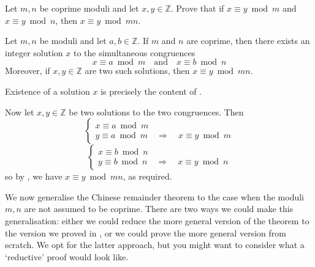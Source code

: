 \begin{exercise}
\label{exCRTUniqueness}
Let $m,n$ be coprime moduli and let $x,y \in \mathbb{Z}$. Prove that if $x \equiv y \bmod m$ and $x \equiv y \bmod n$, then $x \equiv y \bmod{mn}$.
\end{exercise}

\begin{theorem}
\label{thmChineseRemainder}
Let $m,n$ be moduli and let $a,b \in \mathbb{Z}$. If $m$ and $n$ are coprime, then there exists an integer solution $x$ to the simultaneous congruences
\[ x \equiv a \bmod m \quad \text{and} \quad x \equiv b \bmod n \]
Moreover, if $x,y \in \mathbb{Z}$ are two such solutions, then $x \equiv y \bmod{mn}$.
\end{theorem}
\begin{cproof}
Existence of a solution $x$ is precisely the content of .

Now let $x,y \in \mathbb{Z}$ be two solutions to the two congruences. Then
\[ \begin{cases} x \equiv a \bmod m \\ y \equiv a \bmod m \quad \Rightarrow \quad x \equiv y \bmod m \end{cases} \]
\[ \begin{cases} x \equiv b \bmod n \\ y \equiv b \bmod n \quad \Rightarrow \quad x \equiv y \bmod n \end{cases} \]
so by , we have $x \equiv y \bmod{mn}$, as required.
\end{cproof}

We now generalise the Chinese remainder theorem to the case when the moduli $m,n$ are not assumed to be coprime. There are two ways we could make this generalisation: either we could reduce the more general version of the theorem to the version we proved in , or we could prove the more general version from scratch. We opt for the latter approach, but you might want to consider what a `reductive' proof would look like.

